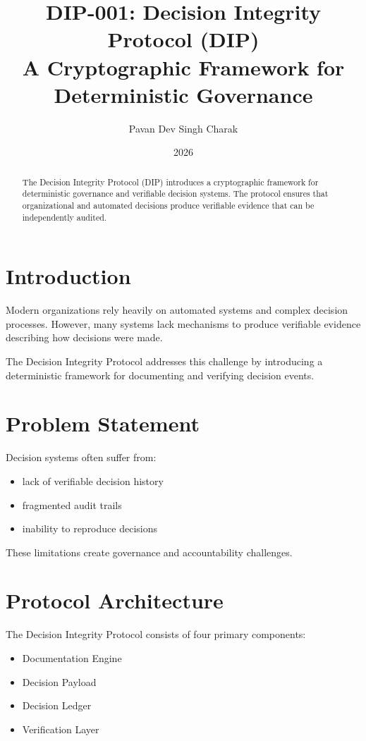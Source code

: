 \documentclass[11pt]{article}
\title{DIP-001: Decision Integrity Protocol (DIP)\\
A Cryptographic Framework for Deterministic Governance}
\author{Pavan Dev Singh Charak}
\date{2026}
\begin{document}
\maketitle

\begin{abstract}

The Decision Integrity Protocol (DIP) introduces a cryptographic
framework for deterministic governance and verifiable decision systems.
The protocol ensures that organizational and automated decisions
produce verifiable evidence that can be independently audited.

\end{abstract}

\section{Introduction}

Modern organizations rely heavily on automated systems and complex
decision processes. However, many systems lack mechanisms to produce
verifiable evidence describing how decisions were made.

The Decision Integrity Protocol addresses this challenge by introducing
a deterministic framework for documenting and verifying decision events.

\section{Problem Statement}

Decision systems often suffer from:

\begin{itemize}
\item lack of verifiable decision history
\item fragmented audit trails
\item inability to reproduce decisions
\end{itemize}

These limitations create governance and accountability challenges.

\section{Protocol Architecture}

The Decision Integrity Protocol consists of four primary components:

\begin{itemize}
\item Documentation Engine
\item Decision Payload
\item Decision Ledger
\item Verification Layer
\end{itemize}
\end{document}
